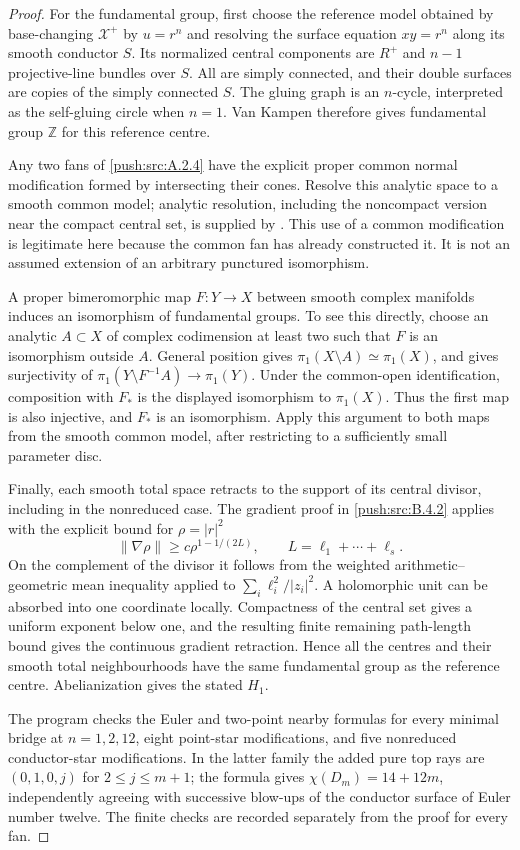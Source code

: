 \begin{proof}
For the fundamental group, first choose the reference
model obtained by base-changing $\mathcal X^+$ by
$u=r^n$ and resolving the surface equation $xy=r^n$
along its smooth conductor $S$. Its normalized central
components are $R^+$ and $n-1$ projective-line bundles
over $S$. All are simply connected, and their double
surfaces are copies of the simply connected $S$.
The gluing graph is an $n$-cycle, interpreted as the
self-gluing circle when $n=1$. Van Kampen therefore
gives fundamental group $\mathbb Z$ for this reference
centre.

Any two fans of \ref{push:src:A.2.4} have the explicit proper common
normal modification formed by intersecting their cones.
Resolve this analytic space to a smooth common model;
analytic resolution, including the noncompact version
near the compact central set, is supplied by
\cite[Theorem 1.6 and its following paragraph]{BM95AB}.
This use of a common modification is legitimate here
because the common fan has already constructed it.
It is not an assumed extension of an arbitrary punctured
isomorphism.

A proper bimeromorphic map $F:Y\to X$ between smooth
complex manifolds induces an isomorphism of fundamental
groups. To see this directly, choose an analytic
$A\subset X$ of complex codimension at least two such
that $F$ is an isomorphism outside $A$. General position
gives $\pi_1(X\setminus A)\simeq\pi_1(X)$, and gives
surjectivity of
$\pi_1(Y\setminus F^{-1}A)\to\pi_1(Y)$.
Under the common-open identification, composition with
$F_*$ is the displayed isomorphism to $\pi_1(X)$.
Thus the first map is also injective, and $F_*$ is an
isomorphism. Apply this argument to both maps from the
smooth common model, after restricting to a sufficiently
small parameter disc.

Finally, each smooth total space retracts to the support
of its central divisor, including in the nonreduced case.
The gradient proof in \ref{push:src:B.4.2} applies with the explicit
bound for $\rho=|r|^2$
\[
 \|\nabla\rho\|\geq c\rho^{1-1/(2L)},
 \qquad L=\ell_1+\cdots+\ell_s.
\]
On the complement of the divisor it follows from the
weighted arithmetic--geometric mean inequality applied
to $\sum_i\ell_i^2/|z_i|^2$. A holomorphic unit can be
absorbed into one coordinate locally. Compactness of
the central set gives a uniform exponent below one,
and the resulting finite remaining path-length bound
gives the continuous gradient retraction. Hence all
the centres and their smooth total neighbourhoods have
the same fundamental group as the reference centre.
Abelianization gives the stated $H_1$.

The program 
checks the Euler and two-point nearby formulas for every
minimal bridge at $n=1,2,12$, eight point-star
modifications, and five nonreduced conductor-star
modifications. In the latter family the added pure top
rays are $(0,1,0,j)$ for $2\leq j\leq m+1$; the formula
gives $\chi(D_m)=14+12m$, independently agreeing with
successive blow-ups of the conductor surface of Euler
number twelve. The finite checks are recorded separately
from the proof for every fan.
\end{proof}

